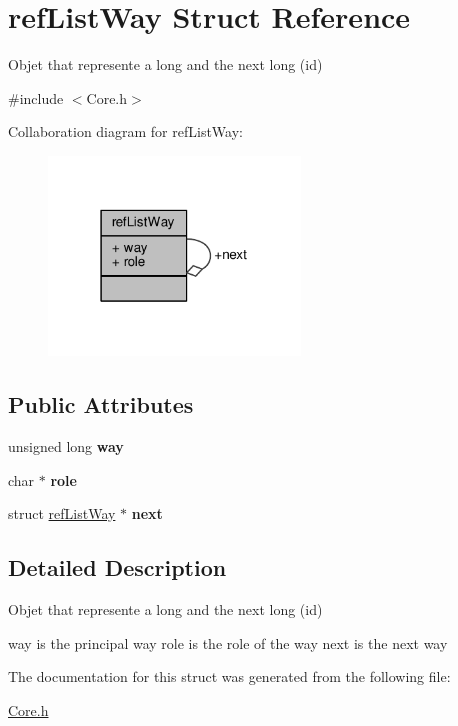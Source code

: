 \hypertarget{structrefListWay}{\section{ref\-List\-Way Struct Reference}
\label{structrefListWay}
}


Objet that represente a long and the next long (id)  




{\ttfamily \#include $<$Core.\-h$>$}



Collaboration diagram for ref\-List\-Way\-:
\nopagebreak
\begin{figure}[H]
\begin{center}
\leavevmode
\includegraphics[width=190pt]{structrefListWay__coll__graph}
\end{center}
\end{figure}
\subsection*{Public Attributes}
\begin{DoxyCompactItemize}
\item 
\hypertarget{structrefListWay_ab4efd61c3ba5bfd6a68aec29ae9ffef0}{unsigned long {\bfseries way}}\label{structrefListWay_ab4efd61c3ba5bfd6a68aec29ae9ffef0}

\item 
\hypertarget{structrefListWay_a1a091291a89a5f54ba76b4e4bdcbe7b1}{char $\ast$ {\bfseries role}}\label{structrefListWay_a1a091291a89a5f54ba76b4e4bdcbe7b1}

\item 
\hypertarget{structrefListWay_aa0b05de016593f1b96812a8ba93fe9ff}{struct \hyperlink{structrefListWay}{ref\-List\-Way} $\ast$ {\bfseries next}}\label{structrefListWay_aa0b05de016593f1b96812a8ba93fe9ff}

\end{DoxyCompactItemize}


\subsection{Detailed Description}
Objet that represente a long and the next long (id) 

way is the principal way role is the role of the way next is the next way 

The documentation for this struct was generated from the following file\-:\begin{DoxyCompactItemize}
\item 
\hyperlink{Core_8h}{Core.\-h}\end{DoxyCompactItemize}
